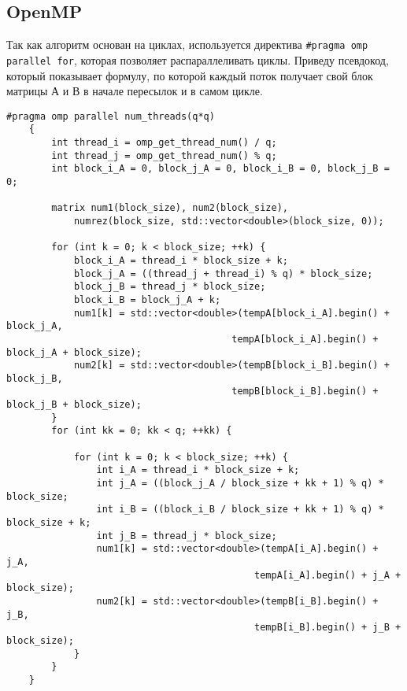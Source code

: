 \documentclass{report}
\begin{document}
\subsection{OpenMP}
Так как алгоритм основан на циклах, используется директива \verb|#pragma omp parallel for|, которая позволяет распараллеливать циклы.
Приведу псевдокод, который показывает формулу, по которой каждый поток получает свой блок матрицы А и В в начале пересылок и в самом цикле.
\begin{lstlisting}
#pragma omp parallel num_threads(q*q)
    {
        int thread_i = omp_get_thread_num() / q;
        int thread_j = omp_get_thread_num() % q;
        int block_i_A = 0, block_j_A = 0, block_i_B = 0, block_j_B = 0;

        matrix num1(block_size), num2(block_size),
            numrez(block_size, std::vector<double>(block_size, 0));

        for (int k = 0; k < block_size; ++k) {
            block_i_A = thread_i * block_size + k;
            block_j_A = ((thread_j + thread_i) % q) * block_size;
            block_j_B = thread_j * block_size;
            block_i_B = block_j_A + k;
            num1[k] = std::vector<double>(tempA[block_i_A].begin() + block_j_A,
                                        tempA[block_i_A].begin() + block_j_A + block_size);
            num2[k] = std::vector<double>(tempB[block_i_B].begin() + block_j_B,
                                        tempB[block_i_B].begin() + block_j_B + block_size);
        }
        for (int kk = 0; kk < q; ++kk) {
             
            for (int k = 0; k < block_size; ++k) {
                int i_A = thread_i * block_size + k;
                int j_A = ((block_j_A / block_size + kk + 1) % q) * block_size;
                int i_B = ((block_i_B / block_size + kk + 1) % q) * block_size + k;
                int j_B = thread_j * block_size;
                num1[k] = std::vector<double>(tempA[i_A].begin() + j_A,
                                            tempA[i_A].begin() + j_A + block_size);
                num2[k] = std::vector<double>(tempB[i_B].begin() + j_B,
                                            tempB[i_B].begin() + j_B + block_size);
            }
        }
    }
\end{lstlisting}
\end{document}
